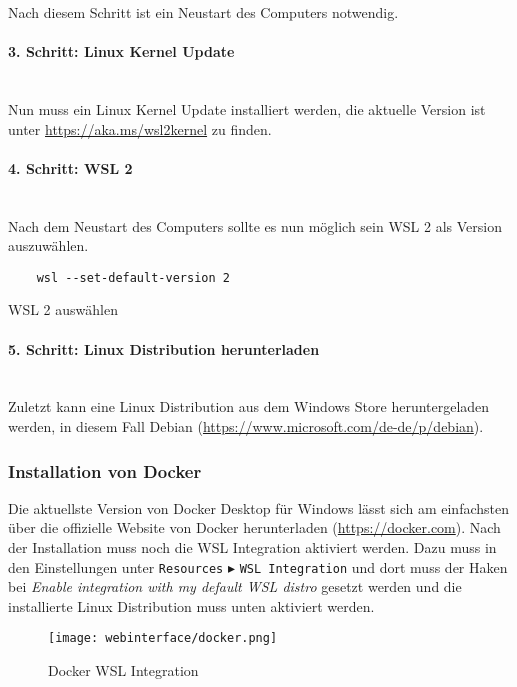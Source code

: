 Nach diesem Schritt ist ein Neustart des Computers notwendig.

\paragraph{3. Schritt: Linux Kernel Update}\mbox{}\\
Nun muss ein Linux Kernel Update installiert werden, die aktuelle Version ist
unter \url{https://aka.ms/wsl2kernel} zu finden.

\paragraph{4. Schritt: WSL 2}\mbox{}\\
Nach dem Neustart des Computers sollte es nun möglich sein WSL 2 als Version
auszuwählen.
\begin{listing}[H]
  \begin{verbatim}
    wsl --set-default-version 2
  \end{verbatim}
  \caption{WSL 2 auswählen}
\end{listing}

\paragraph{5. Schritt: Linux Distribution herunterladen}\mbox{}\\
Zuletzt kann eine Linux Distribution aus dem Windows Store heruntergeladen
werden, in diesem Fall Debian (\url{https://www.microsoft.com/de-de/p/debian}).


\subsubsection{Installation von Docker}
Die aktuellste Version von Docker Desktop für Windows lässt sich am einfachsten
über die offizielle Website von Docker herunterladen (\url{https://docker.com}).
Nach der Installation muss noch die WSL Integration aktiviert werden. Dazu muss
in den Einstellungen unter \verb|Resources| $\blacktriangleright$ \verb|WSL Integration|
und dort muss der Haken bei \textit{Enable integration with my default WSL distro}
gesetzt werden und die installierte Linux Distribution muss unten aktiviert
werden.

\begin{figure}[H]
  \centering
  \texttt{[image: webinterface/docker.png]}
  \caption{Docker WSL Integration}
\end{figure}


